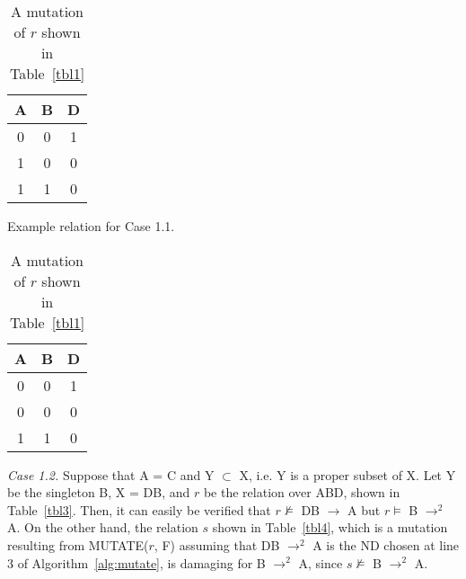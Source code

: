 {\line
\begin{table}[ht]
\begin{minipage}[b]{7cm}
\begin{center}
\begin{tabular}{|c|c|c|} \hline
A & B & D \\ \hline
0 & 0 & 1 \\
1 & 0 & 0 \\
1 & 1 & 0 \\ \hline
\end{tabular}
\end{center}
\caption{\label{tbl1} Example relation for Case 1.1.} 
\end{minipage}
\hfill
\begin{minipage}[b]{7cm}
\begin{center}
\begin{tabular}{|c|c|c|} \hline
A & B & D \\ \hline
0 & 0 & 1 \\
0 & 0 & 0 \\
1 & 1 & 0 \\ \hline
\end{tabular}
\end{center}
\caption{\label{tbl2} A mutation of $r$ shown in Table~\ref{tbl1}} 
\end{minipage}
\end{table}}

{\em Case 1.2.}
Suppose that A = C and Y $\subset$ X, i.e. Y is a proper subset of X.
Let Y be the singleton B, X = DB,
and $r$ be the relation over ABD, shown in Table~\ref{tbl3}.
Then, it can easily be verified that 
$r \not\models$ DB $\to$ A but $r \models$ B $\to^2$ A.
On the other hand, the relation $s$ shown in Table~\ref{tbl4},
which is a mutation resulting from MUTATE($r$, F) assuming that 
DB $\to^2$ A is the ND chosen at line 3 of Algorithm~\ref{alg:mutate},
is damaging for B $\to^2$ A, since $s \not\models$ B $\to^2$ A.

